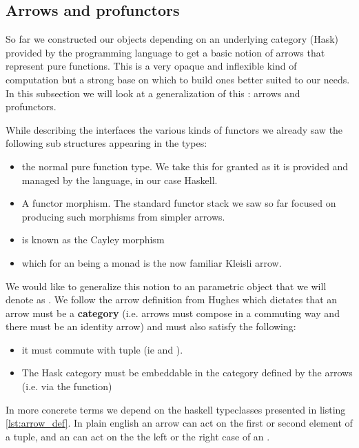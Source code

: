 \subsection{Arrows and profunctors}

So far we constructed our objects depending on an underlying category
(Hask) provided by the programming language to get a basic notion of
arrows that represent pure functions. This is a very opaque and
inflexible kind of computation but a strong base on which to build
ones better suited to our needs. In this subsection we will look at a
generalization of this : arrows and profunctors.

While describing the interfaces the various kinds of functors we
already saw the following sub structures appearing in the types:

\begin{itemize}
\item {} the normal pure function type. We take this for granted as
it is provided and managed by the language, in our case Haskell.
\item {} A functor morphism. The standard functor stack we saw
so far focused on producing such morphisms from simpler arrows.
\item {} is known as the Cayley morphism
\item {} which for an  being a monad is the now familiar
Kleisli arrow.
\end{itemize}

We would like to generalize this notion to an parametric object that
we will denote as \hask{~>}. We follow the arrow definition from
Hughes \cite{hughesProgrammingArrows2005} which dictates that an arrow
must be a \textbf{category} (i.e. arrows must compose in a commuting
way and there must be an identity arrow) and must also satisfy the
following:

\begin{itemize}
\item it must commute with tuple (ie  and ).
\item The Hask category must be embeddable in the category defined by the
arrows (i.e. via the  function)
\end{itemize}

In more concrete terms we depend on the haskell typeclasses presented
in listing \ref{lst:arrow_def}. In plain english an arrow can act on
the first or second element of a tuple, and an  can
act on the the left or the right case of an .

